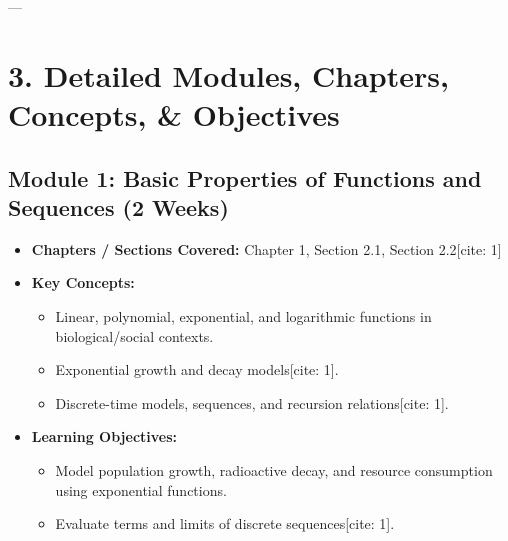 \documentclass[11pt,a4paper]{article}
\begin{document}
---

\section*{3. Detailed Modules, Chapters, Concepts, \& Objectives}

\subsection*{Module 1: Basic Properties of Functions and Sequences (2 Weeks) \cite{1}}
\begin{itemize}
    \item \textbf{Chapters / Sections Covered:} Chapter 1, Section 2.1, Section 2.2[cite: 1]
    \item \textbf{Key Concepts:}
    \begin{itemize}
        \item Linear, polynomial, exponential, and logarithmic functions in biological/social contexts.
        \item Exponential growth and decay models[cite: 1].
        \item Discrete-time models, sequences, and recursion relations[cite: 1].
    \end{itemize}
    \item \textbf{Learning Objectives:}
    \begin{itemize}
        \item Model population growth, radioactive decay, and resource consumption using exponential functions.
        \item Evaluate terms and limits of discrete sequences[cite: 1].
    \end{itemize}
\end{itemize}
\end{document}
